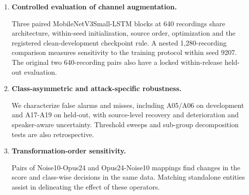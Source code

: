 \begin{enumerate}

\item \textbf{Controlled evaluation of channel augmentation.}

Three paired MobileNetV3Small-LSTM blocks at 640 recordings share architecture, within-seed initialization, source order, optimization and the registered clean-development checkpoint rule. A nested 1,280-recording comparison measures sensitivity to the training protocol within seed 9207. The original two 640-recording pairs also have a locked within-release held-out evaluation.

\item \textbf{Class-asymmetric and attack-specific robustness.}

We characterize false alarms and misses, including A05/A06 on development and A17-A19 on held-out, with source-level recovery and deterioration and speaker-aware uncertainty. Threshold sweeps and sub-group decomposition tests are also retrospective.

\item \textbf{Transformation-order sensitivity.}

Pairs of Noise10-Opus24 and Opus24-Noise10 mappings find changes in the score and class-wise decisions in the same data. Matching standalone entities assist in delineating the effect of these operators.

\end{enumerate}
